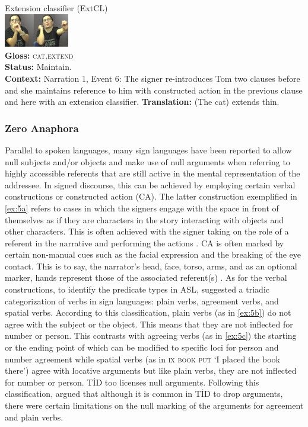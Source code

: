 \documentclass[review]{elsarticle} %
\begin{document}
\begin{exe}
\begin{xlist}
\ex \label{ex:4d} Extension classifier (ExtCL) \\\glll
{} \includegraphics[width=80pt]{pictures/p9.png} \\ \textbf{Gloss:} \textsc{cat.extend} \\ 
\textbf{Status:} Maintain. \\
\glt \textbf{Context:} Narration 1, Event 6: The signer re-introduces Tom two clauses before and she maintains reference to him with constructed action in the previous clause and here with an extension classifier.
\glt \textbf{Translation:} (The cat) extends thin.
\end{xlist}
\end{exe}

\hypertarget{zero-anaphora}{%
\subsubsection{Zero Anaphora}\label{zero-anaphora}}

Parallel to spoken languages, many sign languages have been reported to
allow null subjects and/or objects and make use of null arguments when
referring to highly accessible referents that are still active in the
mental representation of the addressee. In signed discourse, this can be
achieved by employing certain verbal constructions or constructed action
(CA). The latter construction exemplified in \ref{ex:5a} refers to cases
in which the signers engage with the space in front of themselves as if
they are characters in the story interacting with objects and other
characters. This is often achieved with the signer taking on the role of
a referent in the narrative and performing the actions
\citep{metzger1995}. CA is often marked by certain non-manual cues such
as the facial expression and the breaking of the eye contact. This is to
say, the narrator's head, face, torso, arms, and as an optional marker,
hands represent those of the associated referent(s) \citep{smith2014}.
As for the verbal constructions, to identify the predicate types in ASL,
\citet{padden1986} suggested a triadic categorization of verbs in sign
languages: plain verbs, agreement verbs, and spatial verbs. According to
this classification, plain verbs (as in \ref{ex:5b}) do not agree with
the subject or the object. This means that they are not inflected for
number or person. This contrasts with agreeing verbs (as in \ref{ex:5c})
the starting or the ending point of which can be modified to specific
loci for person and number agreement while spatial verbs (as in
\textsc{ix book put} `I placed the book there') agree with locative
arguments but like plain verbs, they are not inflected for number or
person. TİD too licenses null arguments. Following this classification,
\citet{sevinc2006} argued that although it is common in TİD to drop
arguments, there were certain limitations on the null marking of the
arguments for agreement and plain verbs.
\end{document}
